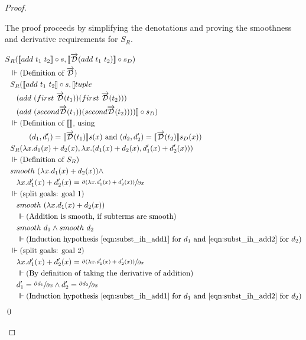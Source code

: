 \documentclass[11pt, final]{article}
\begin{document}
\begin{proof}
\begin{enumerate}
      The proof proceeds by simplifying the denotations and proving the smoothness and derivative requirements for $S_R$.

      \begin{align*}
        S&_R(\llbracket add\ t_1\ t_2 \rrbracket \circ s, \llbracket \overrightarrow{\mathcal{D}}(add\ t_1\ t_2) \rrbracket \circ s_D) \\
        &\Vdash \text{(Definition of $\overrightarrow{\mathcal{D}}$)}\\
        &S_R(\llbracket add\ t_1\ t_2 \rrbracket \circ s, \llbracket tuple\ \\
        & \;\;\;(add\ (first\ \overrightarrow{\mathcal{D}}(t_1)) (first\ \overrightarrow{\mathcal{D}}(t_2)))\ \\
        & \;\;\;(add\ (second \overrightarrow{\mathcal{D}}(t_1)) (second \overrightarrow{\mathcal{D}}(t_2)))) \rrbracket \circ s_D) \\
        &\Vdash \text{(Definition of $\llbracket\rrbracket$, using} \\
        & \;\;\;\;\;\;\;\;\; \text{$(d_1, d_1') = \llbracket \overrightarrow{\mathcal{D}}(t_1) \rrbracket s(x)$ and $(d_2, d_2') = \llbracket \overrightarrow{\mathcal{D}}(t_2) \rrbracket s_D(x)$)}\\
        &S_R(\lambda x. d_1(x) + d_2(x), \lambda x. (d_1(x) + d_2(x), d_1'(x) + d_2'(x))) \\
        &\Vdash \text{(Definition of $S_R$)}\\
        & smooth\ (\lambda x. d_1(x) + d_2(x)) \wedge \\
        & \;\;\; \lambda x. d_1'(x) + d_2'(x) = \sfrac{\partial{(\lambda x. d_1'(x) + d_2'(x))}}{\partial{x}} \\
        &\Vdash \text{(split goals: goal 1)}\\
        &\;\;\;smooth\ (\lambda x. d_1(x) + d_2(x)) \\
        &\;\;\;\Vdash
          \text{(Addition is smooth, if subterms are smooth)}\\
        &\;\;\;smooth\ d_1 \wedge smooth\ d_2 \\
        &\;\;\;\Vdash \text{(Induction hypothesis \ref{eqn:subst_ih_add1} for $d_1$ and \ref{eqn:subst_ih_add2} for $d_2$)}\\
        &\Vdash \text{(split goals: goal 2)}\\
        &\;\;\;\lambda x. d_1'(x) + d_2'(x) = \sfrac{\partial{(\lambda x. d_1'(x) + d_2'(x))}}{\partial{x}} \\
        &\;\;\;\Vdash \text{(By definition of taking the derivative of addition)} \\
        &\;\;\; d_1' = \sfrac{\partial{d_1}}{\partial{x}} \wedge d_2' = \sfrac{\partial{d_2}}{\partial{x}} \\
        &\;\;\;\Vdash \text{(Induction hypothesis \ref{eqn:subst_ih_add1} for $d_1$ and \ref{eqn:subst_ih_add2} for $d_2$)}\\
      \end{align*} \qed


\end{enumerate}
\end{proof}
\end{document}
